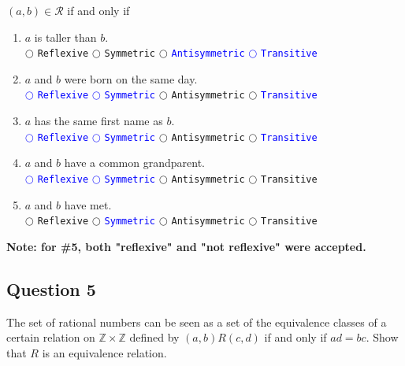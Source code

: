 \documentclass{article}
\begin{document}
$(a,b)\in \mathcal{R}$ if and only if
\begin{enumerate}
\item $a$ is taller than $b$.\\
$\bigcirc$ \texttt{Reflexive} \quad $\bigcirc$ \texttt{Symmetric} \quad $\bigcirc$ \textcolor{blue}{\texttt{Antisymmetric} \quad $\bigcirc$ \texttt{Transitive}}

\item $a$ and $b$ were born on the same day.\\
\textcolor{blue}{$\bigcirc$ \texttt{Reflexive} \quad $\bigcirc$ \texttt{Symmetric}} \quad $\bigcirc$ \texttt{Antisymmetric} \quad $\bigcirc$ \textcolor{blue}{\texttt{Transitive}}

\item $a$ has the same first name as $b$.\\
\textcolor{blue}{$\bigcirc$ \texttt{Reflexive} \quad $\bigcirc$ \texttt{Symmetric}} \quad $\bigcirc$ \texttt{Antisymmetric} \quad $\bigcirc$ \textcolor{blue}{\texttt{Transitive}}

\item $a$ and $b$ have a common grandparent.\\
\textcolor{blue}{$\bigcirc$ \texttt{Reflexive} \quad $\bigcirc$ \texttt{Symmetric}} \quad $\bigcirc$ \texttt{Antisymmetric} \quad $\bigcirc$ \texttt{Transitive}

\item $a$ and $b$ have met.\\ 
$\bigcirc$ \texttt{Reflexive} \quad $\bigcirc$ \textcolor{blue}{\texttt{Symmetric}} \quad $\bigcirc$ \texttt{Antisymmetric} \quad $\bigcirc$ \texttt{Transitive}

\end{enumerate}
\textbf{Note: for \#5, both "reflexive" and "not reflexive" were accepted.}

\subsection*{Question 5}
The set of rational numbers can be seen as a set of the equivalence classes of a certain relation on $\mathbb{Z} \times \mathbb{Z}$ defined by $(a, b)R(c, d)$ if and only if $ad = bc$. Show that $R$ is an equivalence relation.
\end{document}
